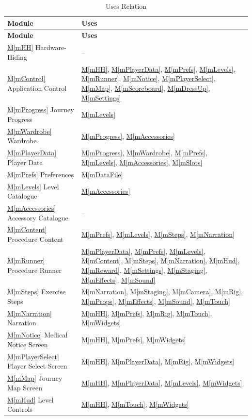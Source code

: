 \documentclass[12pt, titlepage]{article}
\newcommand{\mref}[1]{\hyperref[#1]{M\ref*{#1}}}
\begin{document}
\begin{longtable}{p{} p{}}
\caption{Uses Relation} \label{TblUses}\\
\toprule
\textbf{Module} & \textbf{Uses}\\
\midrule
\endfirsthead
\toprule
\textbf{Module} & \textbf{Uses}\\
\midrule
\endhead
\mref{mHH} Hardware-Hiding & --\\
\mref{mControl} Application Control & \mref{mHH}, \mref{mPlayerData}, \mref{mPrefs}, \mref{mLevels}, \mref{mRunner}, \mref{mNotice}, \mref{mPlayerSelect}, \mref{mMap}, \mref{mScoreboard}, \mref{mDressUp}, \mref{mSettings}\\
\mref{mProgress} Journey Progress & \mref{mLevels}\\
\mref{mWardrobe} Wardrobe & \mref{mProgress}, \mref{mAccessories}\\
\mref{mPlayerData} Player Data & \mref{mProgress}, \mref{mWardrobe}, \mref{mPrefs}, \mref{mLevels}, \mref{mAccessories}, \mref{mSlots}\\
\mref{mPrefs} Preferences & \mref{mDataFile}\\
\mref{mLevels} Level Catalogue & \mref{mAccessories}\\
\mref{mAccessories} Accessory Catalogue & --\\
\mref{mContent} Procedure Content & \mref{mPrefs}, \mref{mLevels}, \mref{mSteps}, \mref{mNarration}\\
\mref{mRunner} Procedure Runner & \mref{mPlayerData}, \mref{mPrefs}, \mref{mLevels}, \mref{mContent}, \mref{mSteps}, \mref{mNarration}, \mref{mHud}, \mref{mReward}, \mref{mSettings}, \mref{mStaging}, \mref{mEffects}, \mref{mSound}\\
\mref{mSteps} Exercise Steps & \mref{mNarration}, \mref{mStaging}, \mref{mCamera}, \mref{mRig}, \mref{mProps}, \mref{mEffects}, \mref{mSound}, \mref{mTouch}\\
\mref{mNarration} Narration & \mref{mHH}, \mref{mPrefs}, \mref{mRig}, \mref{mTouch}, \mref{mWidgets}\\
\mref{mNotice} Medical Notice Screen & \mref{mHH}, \mref{mPrefs}, \mref{mWidgets}\\
\mref{mPlayerSelect} Player Select Screen & \mref{mHH}, \mref{mPlayerData}, \mref{mRig}, \mref{mWidgets}\\
\mref{mMap} Journey Map Screen & \mref{mHH}, \mref{mPlayerData}, \mref{mLevels}, \mref{mWidgets}\\
\mref{mHud} Level Controls & \mref{mHH}, \mref{mTouch}, \mref{mWidgets}\\

\end{longtable}
\end{document}
